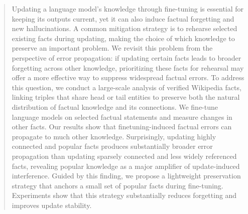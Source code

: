 \begin{abstract}
Updating a language model’s knowledge through fine-tuning is essential for keeping its outputs current, yet it can also induce factual forgetting and new hallucinations. A common mitigation strategy is to rehearse selected existing facts during updating, making the choice of which knowledge to preserve an important problem. We revisit this problem from the perspective of error propagation: if updating certain facts leads to broader forgetting across other knowledge, prioritizing these facts for rehearsal may offer a more effective way to suppress widespread factual errors.
To address this question, we conduct a large-scale analysis of verified Wikipedia facts, linking triples that share head or tail entities to preserve both the natural distribution of factual knowledge and its connections. We fine-tune language models on selected factual statements and measure changes in other facts.
Our results show that finetuning-induced factual errors can propagate to much other knowledge. Surprisingly, updating highly connected and popular facts produces substantially broader error propagation than updating sparsely connected and less widely referenced facts, revealing popular knowledge as a major amplifier of update-induced interference. Guided by this finding, we propose a lightweight preservation strategy that anchors a small set of popular facts during fine-tuning. Experiments show that this strategy substantially reduces forgetting and improves update stability.
\end{abstract}






